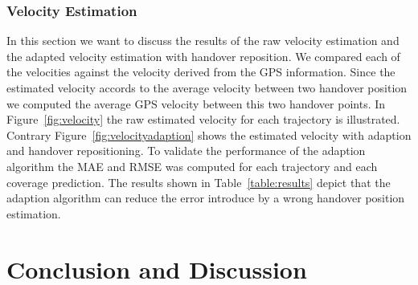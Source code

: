 \documentclass[twocolumn]{bmcart}%
\begin{document}
\subsubsection*{Velocity Estimation}
In this section we want to discuss the results of the raw velocity estimation and the adapted velocity estimation with handover reposition. We compared each of the velocities against the velocity derived from the GPS information. Since the estimated velocity accords to the average velocity between two handover position we computed the average GPS velocity between this two handover points. In Figure~\ref{fig:velocity} the raw estimated velocity for each trajectory is illustrated. Contrary Figure~\ref{fig:velocityadaption} shows the estimated velocity with adaption and handover repositioning. To validate the performance of the adaption algorithm the MAE and RMSE was computed for each trajectory and each coverage prediction. The results shown in Table~\ref{table:results} depict that the adaption algorithm can reduce the error introduce by a wrong handover position estimation.
\section*{Conclusion and Discussion}


\end{document}
